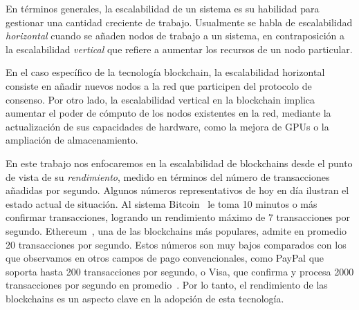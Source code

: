 En términos generales, la escalabilidad de un sistema es su habilidad para gestionar una
cantidad creciente de trabajo.
%
Usualmente se habla de escalabilidad \emph{horizontal} cuando se añaden nodos de trabajo a un sistema,
en contraposición a la escalabilidad \emph{vertical} que refiere a aumentar los recursos de un nodo particular.

En el caso específico de la tecnología blockchain, la escalabilidad horizontal consiste en añadir nuevos
nodos a la red que participen del protocolo de consenso.
%
Por otro lado, la escalabilidad vertical en la blockchain implica aumentar el poder de cómputo de los
nodos existentes en la red, mediante la actualización de sus capacidades de hardware, como la mejora de
GPUs o la ampliación de almacenamiento.

En este trabajo nos enfocaremos en la escalabilidad de blockchains desde el punto de vista de su \emph{rendimiento}, medido
en términos del número de transacciones añadidas por segundo.
%
Algunos números representativos de hoy en día ilustran el estado actual de situación.
Al sistema Bitcoin~\cite{nakamoto06bitcoin} le toma 10 minutos o más
confirmar transacciones, logrando un rendimiento máximo de 7 transacciones por segundo.
%
Ethereum~\cite{wood2014ethereum}, una de las blockchains más populares, admite en promedio 20 transacciones por segundo.
%
Estos números son muy bajos comparados con los que observamos en otros campos de pago convencionales,
como PayPal que soporta hasta 200 transacciones por segundo, o Visa, que confirma y procesa 2000 transacciones
por segundo en promedio~\cite{tps.numbers}.
%
Por lo tanto, el rendimiento de las blockchains es un aspecto clave en la adopción de esta tecnología.
%


